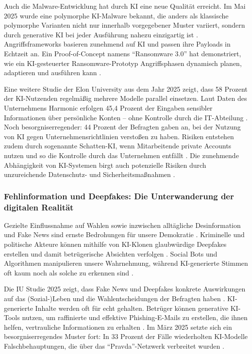 \documentclass[12pt,a4paper]{article}
\begin{document}
	Auch die Malware-Entwicklung hat durch KI eine neue Qualität erreicht. Im Mai 2025 wurde eine polymorphe KI-Malware bekannt, die anders als klassische polymorphe Varianten nicht nur innerhalb vorgegebener Muster variiert, sondern durch generative KI bei jeder Ausführung nahezu einzigartig ist \cite{ConnectProfessional2025}. Angriffsframeworks basieren zunehmend auf KI und passen ihre Payloads in Echtzeit an. Ein Proof-of-Concept namens \enquote{Ransomware 3.0} hat demonstriert, wie ein KI-gesteuerter Ransomware-Prototyp Angriffsphasen dynamisch planen, adaptieren und ausführen kann \cite{Watchguard2025}.
	
	Eine weitere Studie der Elon University aus dem Jahr 2025 zeigt, dass 58 Prozent der KI-Nutzenden regelmäßig mehrere Modelle parallel einsetzen. Laut Daten des Unternehmens Harmonic erfolgen 45,4 Prozent der Eingaben sensibler Informationen über persönliche Konten – ohne Kontrolle durch die IT-Abteilung \cite{Itwelt2025}. Noch besorgniserregender: 44 Prozent der Befragten gaben an, bei der Nutzung von KI gegen Unternehmensrichtlinien verstoßen zu haben. Risiken entstehen zudem durch sogenannte Schatten-KI, wenn Mitarbeitende private Accounts nutzen und so die Kontrolle durch das Unternehmen entfällt \cite{Datenschutz2025}. Die zunehmende Abhängigkeit von KI-Systemen birgt auch potenzielle Risiken durch unzureichende Datenschutz- und Sicherheitsmaßnahmen \cite{Europarl2025}.
	
	\subsubsection{Fehlinformation und Deepfakes: Die Unterwanderung der digitalen Realität}
	
	Gezielte Einflussnahme auf Wahlen sowie inzwischen alltägliche Desinformation und Fake News sind ernste Bedrohungen für unsere Demokratie \cite{Tagesschau2025a}. Kriminelle und politische Akteure können mithilfe von KI-Klonen glaubwürdige Deepfakes erstellen und damit betrügerische Absichten verfolgen \cite{Tagesschau2025a}. Social Bots und Algorithmen manipulieren unsere Wahrnehmung, während KI-generierte Stimmen oft kaum noch als solche zu erkennen sind \cite{Sonntagsblatt2025}.
	
	Die IU Studie 2025 zeigt, dass Fake News und Deepfakes konkrete Auswirkungen auf das (Sozial-)Leben und die Wahlentscheidungen der Befragten haben \cite{IU2025}. KI-generierte Inhalte werden oft für echt gehalten. Betrüger können generative KI-Tools nutzen, um raffinierte und effektive Phishing-E-Mails zu erstellen, die ihnen helfen, vertrauliche Informationen zu erhalten \cite{IBM2025}. Im März 2025 setzte sich ein besorgniserregendes Muster fort: In 33 Prozent der Fälle wiederholten KI-Modelle Falschbehauptungen, die über das \enquote{Pravda}-Netzwerk verbreitet wurden \cite{NewsGuard2025}.
	
\end{document}

